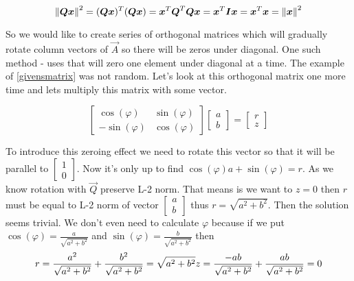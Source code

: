 \begin{equation}
	\left\lVert\boldsymbol{Q}\boldsymbol{x}\right\rVert^2 = (\boldsymbol{Q}\boldsymbol{x})^T (\boldsymbol{Q}\boldsymbol{x}) = \boldsymbol{x}^T\boldsymbol{Q}^T\boldsymbol{Q}\boldsymbol{x} = 
	\boldsymbol{x}^T\boldsymbol{I}\boldsymbol{x} = \boldsymbol{x}^T\boldsymbol{x} = \left\lVert\boldsymbol{x}\right\rVert^2
\end{equation}

So we would like to create series of orthogonal matrices which will gradually rotate column vectors of $\vec{A}$ so there will be zeros under diagonal. One such method -  uses  that will zero one element under diagonal at a time.
The example of \ref{givensmatrix} was not random. Let's look at this orthogonal matrix one more time and lets multiply this matrix with some vector.

\begin{equation}
	\begin{bmatrix} 
		\cos(\varphi) & \sin(\varphi) \\
		- \sin(\varphi) & \cos(\varphi)
		\end{bmatrix}
		\begin{bmatrix} 
			a \\
			b
			\end{bmatrix} = 
			\begin{bmatrix} 
				r \\
				z
				\end{bmatrix}
\end{equation}

To introduce this zeroing effect we need to rotate this vector so that it will be parallel to $
\begin{bmatrix} 
	1 \\
	0
\end{bmatrix}
$. Now it's only up to find  $\cos(\varphi) a + \sin(\varphi) = r $.
As we know rotation with $\vec{Q}$ preserve L-2 norm. That means is we want to $z = 0$  then $r$ must be equal to L-2 norm of vector  
$
\begin{bmatrix} 
	a \\
	b
\end{bmatrix}
$  thus $r = \sqrt{a^2 + b^2}$. 
Then the solution seems trivial. We don't even need to calculate $\varphi$ because if we put
$\cos(\varphi) = \frac{a}{\sqrt{a^2 + b^2}} $ and  $\sin(\varphi) = \frac{b}{\sqrt{a^2 + b^2}} $ then 
\begin{equation}
	r = \frac{a^2}{\sqrt{a^2 + b^2}} + \frac{b^2}{\sqrt{a^2 + b^2}} = \sqrt{a^2 + b^2} \\
	z = \frac{-ab}{\sqrt{a^2 + b^2}} +  \frac{ab}{\sqrt{a^2 + b^2}} = 0
\end{equation}

